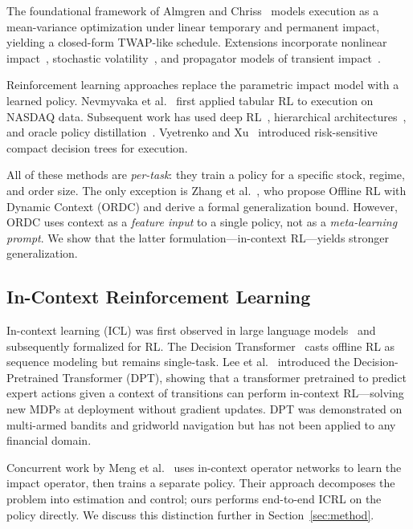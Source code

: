 \documentclass[sigconf,review,anonymous]{acmart}
\begin{document}
The foundational framework of Almgren and Chriss~\cite{almgren2001optimal} models execution as a mean-variance optimization under linear temporary and permanent impact, yielding a closed-form TWAP-like schedule.
Extensions incorporate nonlinear impact~\cite{gatheral2010no, obizhaeva2013optimal}, stochastic volatility~\cite{cartea2015algorithmic}, and propagator models of transient impact~\cite{bouchaud2004fluctuations}.

Reinforcement learning approaches replace the parametric impact model with a learned policy.
Nevmyvaka et al.~\cite{nevmyvaka2006reinforcement} first applied tabular RL to execution on NASDAQ data.
Subsequent work has used deep RL~\cite{hendricks2014reinforcement, karpe2020multi, cheridito2025reinforcement}, hierarchical architectures~\cite{kim2024adaptive}, and oracle policy distillation~\cite{fang2021universal}.
Vyetrenko and Xu~\cite{vyetrenko2019risk} introduced risk-sensitive compact decision trees for execution.

All of these methods are \emph{per-task}: they train a policy for a specific stock, regime, and order size.
The only exception is Zhang et al.~\cite{zhang2023towards}, who propose Offline RL with Dynamic Context (ORDC) and derive a formal generalization bound.
However, ORDC uses context as a \emph{feature input} to a single policy, not as a \emph{meta-learning prompt}.
We show that the latter formulation---in-context RL---yields stronger generalization.

\subsection{In-Context Reinforcement Learning}

In-context learning (ICL) was first observed in large language models~\cite{brown2020language} and subsequently formalized for RL.
The Decision Transformer~\cite{chen2021decision} casts offline RL as sequence modeling but remains single-task.
Lee et al.~\cite{lee2023supervised} introduced the Decision-Pretrained Transformer (DPT), showing that a transformer pretrained to predict expert actions given a context of transitions can perform in-context RL---solving new MDPs at deployment without gradient updates.
DPT was demonstrated on multi-armed bandits and gridworld navigation but has not been applied to any financial domain.

Concurrent work by Meng et al.~\cite{meng2025solving} uses in-context operator networks to learn the impact operator, then trains a separate policy.
Their approach decomposes the problem into estimation and control; ours performs end-to-end ICRL on the policy directly.
We discuss this distinction further in Section~\ref{sec:method}.
\end{document}
